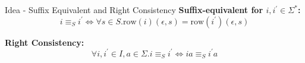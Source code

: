 \documentclass{beamer}
\begin{document}
\begin{frame}{Idea - Suffix Equivalent and Right Consistency}
    \textbf{Suffix-equivalent for $i, i^{\prime}\in \Sigma^{*}$: }
    $$
        i \equiv_{S} i^{\prime} \Leftrightarrow  \forall s \in S. \text{row}(i)(\epsilon,s) = \text{row}(i^{\prime})(\epsilon,s)
    $$

    \textbf{Right Consistency: }
    $$
        \forall i,i^{\prime} \in I,a \in \Sigma. i \equiv_{S} i^{\prime} \Leftrightarrow  ia \equiv_{S} i^{\prime}a
    $$
\end{frame}

\end{document}
